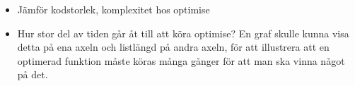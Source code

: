 \documentclass[Rapport]{subfiles}
\begin{document}
{{\begin{itemize}
\begin{itemize}
        Antagligen tillräckligt  intressant att ha 2 st av dem, tex optfunktionens storlek mot tid
                                          samt inputens storlek mot tid.
            \end{itemize}
        \item Jämför kodstorlek, komplexitet hos optimise
        \item Hur stor del av tiden går åt till att köra optimise? En graf skulle kunna visa
          detta på ena axeln och listlängd på andra axeln, för att illustrera att
          en optimerad funktion måste köras många gånger för att man ska vinna något på det.

                                          


    \end{itemize}

    }
}
\end{document}
